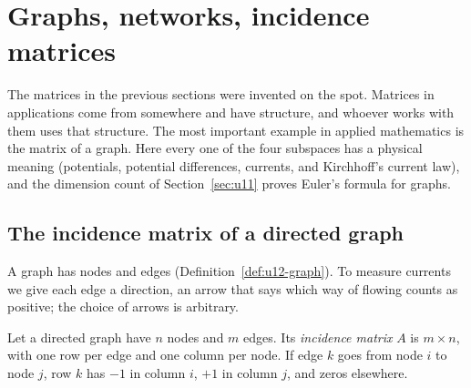 \section{Graphs, networks, incidence matrices}\label{sec:u13}

The matrices in the previous sections were invented on the spot. Matrices in applications come from
somewhere and have structure, and whoever works with them uses that structure. The most important
example in applied mathematics is the matrix of a graph. Here every one of the four subspaces has a
physical meaning (potentials, potential differences, currents, and Kirchhoff's current law), and
the dimension count of Section~\ref{sec:u11} proves Euler's formula for graphs.

\subsection{The incidence matrix of a directed graph}

A graph has nodes and edges (Definition~\ref{def:u12-graph}). To measure currents we give each edge a
direction, an arrow that says which way of flowing counts as positive; the choice of arrows is
arbitrary.

\begin{definition}\label{def:u13-incidence}
Let a directed graph have $n$ nodes and $m$ edges. Its \emph{incidence matrix} $A$ is $m\times n$,
with one row per edge and one column per node. If edge $k$ goes from node $i$ to node $j$, row $k$
has $-1$ in column $i$, $+1$ in column $j$, and zeros elsewhere.
\end{definition}

